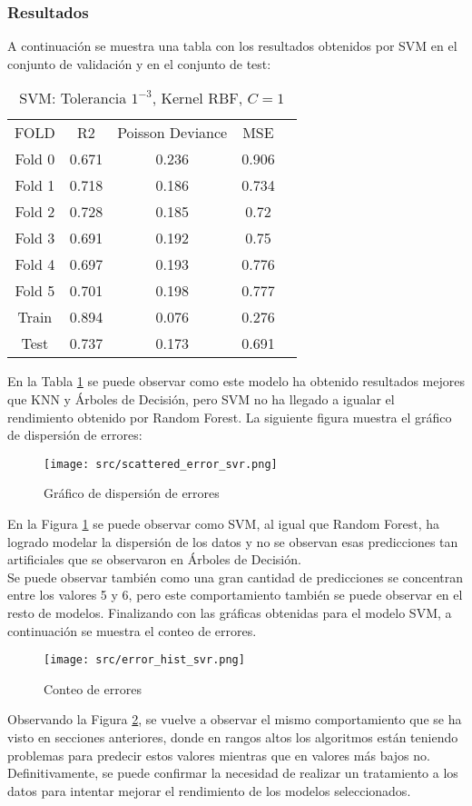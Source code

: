 \subsubsection*{Resultados}
A continuación se muestra una tabla con los resultados obtenidos por SVM en el conjunto de validación y en el conjunto de test:
\begin{table}[H]
	\centering
	\begin{tabular}{|c|c|c|c|c}
		\cline{1-4}
		FOLD   & R2    & Poisson Deviance & MSE   \\ \cline{1-4}
		Fold 0 & 0.671 & 0.236            & 0.906 \\ \cline{1-4}
		Fold 1 & 0.718 & 0.186            & 0.734 \\ \cline{1-4}
		Fold 2 & 0.728 & 0.185            & 0.72  \\ \cline{1-4}
		Fold 3 & 0.691 & 0.192            & 0.75  \\ \cline{1-4}
		Fold 4 & 0.697 & 0.193            & 0.776 \\ \cline{1-4}
		Fold 5 & 0.701 & 0.198            & 0.777 \\ \cline{1-4}
		Train  & 0.894 & 0.076            & 0.276 \\ \cline{1-4}
		Test   & 0.737 & 0.173            & 0.691 \\ \cline{1-4}
	\end{tabular}
	\caption{SVM: Tolerancia $1^{-3}$, Kernel RBF, $C=1$}
	\label{tab:svm_res}
\end{table}
En la Tabla \ref{tab:svm_res} se puede observar como este modelo ha obtenido resultados mejores que KNN y Árboles de Decisión, pero SVM no ha llegado a igualar el rendimiento obtenido por Random Forest.
\clearpage
La siguiente figura muestra el gráfico de dispersión de errores:
\begin{figure}[H]
	\centering
	\texttt{[image: src/scattered\_error\_svr.png]}
	\caption{Gráfico de dispersión de errores}
	\label{fig:svr_scattered}
\end{figure}
En la Figura \ref{fig:svr_scattered} se puede observar como SVM, al igual que Random Forest, ha logrado modelar la dispersión de los datos y no se observan esas predicciones tan artificiales que se observaron en Árboles de Decisión.\\
Se puede observar también como una gran cantidad de predicciones se concentran entre los valores 5 y 6, pero este comportamiento también se puede observar en el resto de modelos.
\clearpage
Finalizando con las gráficas obtenidas para el modelo SVM, a continuación se muestra el conteo de errores.
\begin{figure}[H]
	\centering
	\texttt{[image: src/error\_hist\_svr.png]}
	\caption{Conteo de errores}
	\label{fig:svr_error_plot}
\end{figure}
Observando la Figura \ref{fig:svr_error_plot}, se vuelve a observar el mismo comportamiento que se ha visto en secciones anteriores, donde en rangos altos los algoritmos están teniendo problemas para predecir estos valores mientras que en valores más bajos no. Definitivamente, se puede confirmar la necesidad de realizar un tratamiento a los datos para intentar mejorar el rendimiento de los modelos seleccionados.
\clearpage
